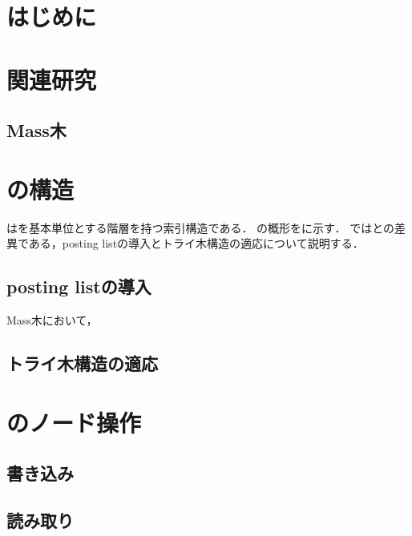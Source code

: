 
\section{はじめに}

\section{関連研究}
\label{sec:relatedwork}

\subsection{\Bctree{}}
\subsection{Mass木}

\section{\Bcforest{}の構造}
\label{sec:bc_forest_structure}

\Bcforest{}は\Bctree{}を基本単位とする階層を持つ索引構造である．
\Bcforest{}の概形をに示す．
\Sec{\ref{sec:bc_forest_structure}}では\Bctree{}との差異である，posting listの導入とトライ木構造の適応について説明する．

\subsection{posting listの導入}

Mass木において，

\subsection{トライ木構造の適応}

\section{\Bcforest{}のノード操作}
\label{sec:node_operation}

\subsection{書き込み}
\subsection{読み取り}


